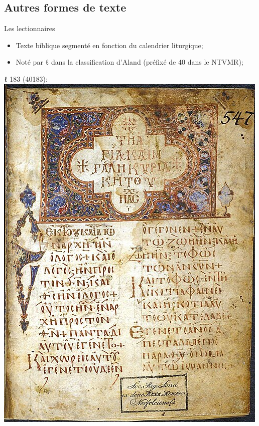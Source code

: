 \documentclass[11pt]{beamer}
\begin{document}
\subsection{Autres formes de texte}

\begin{frame}{Les lectionnaires}
\begin{minipage}{.5\textwidth}
    \begin{itemize}
        \item Texte biblique segmenté en fonction du calendrier liturgique;
        \item Noté par ℓ dans la classification d'Aland (préfixé de 40 dans le NTVMR);
    \end{itemize}
\end{minipage}%
\hfill
\begin{minipage}{.4\textwidth}
ℓ 183 (40183):\\

    \includegraphics[scale=.2]{img/Lectionary_183_folio_2.JPG}
\end{minipage}

\end{frame}
\end{document}
